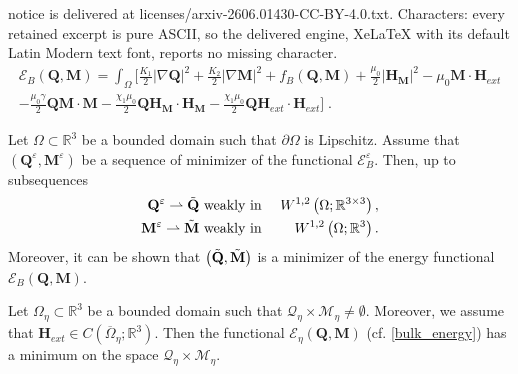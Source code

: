 \documentclass[10pt,a4paper]{amsart}
\def \Mvec{\mathbf{M}}
\def\Hvec{\mathbf{H}}
\def\Qvec{\mathbf{Q}}
\begin{document}
notice is delivered at licenses/arxiv-2606.01430-CC-BY-4.0.txt. Characters: every retained excerpt is pure ASCII, so the delivered engine, XeLaTeX with its default Latin Modern text font, reports no missing character.
\begin{eqnarray}\label{bulk_energy}
\mathcal{E}_B\left(\Qvec, \Mvec\right) = \int_{\Omega}\biggl[ \frac{K_1}{2}|\nabla \Qvec|^2 + \frac{K_2}{2}|\nabla \Mvec|^2 + f_B\left(\Qvec, \Mvec\right) + \frac{\mu_0}{2}|\Hvec_{\Mvec}|^2 - \mu_0\Mvec\cdot \Hvec_{ext}\nonumber\\
- \frac{\mu_0\gamma}{2}\Qvec\Mvec\cdot\Mvec - \frac{\chi_1\mu_0}{2}\Qvec\Hvec_{\Mvec}\cdot\Hvec_{\Mvec} - \frac{\chi_1\mu_0}{2}\Qvec\Hvec_{ext}\cdot\Hvec_{ext}\biggr]\;.
\end{eqnarray}

\begin{proposition}\label{energy_bound}
Let $\Omega\subset\mathbb R^3$ be a bounded domain such that $\partial\Omega$ is Lipschitz. Assume that $\left(\Qvec^{\varepsilon}, \Mvec^{\varepsilon}\right)$ be a sequence of minimizer of the functional $\mathcal{E}^{\varepsilon}_B$. Then, up to subsequences 
\begin{eqnarray}
\Qvec^{\varepsilon}\rightharpoonup\Tilde{\Qvec} &\mbox{ weakly in }& W^{1,2}\left(\Omega; \mathbb R^{3\times 3}\right),\\
\Mvec^{\varepsilon}\rightharpoonup\Tilde{\Mvec} &\mbox{ weakly in }& W^{1,2}\left(\Omega; \mathbb R^3\right).
\end{eqnarray}
Moreover, it can be shown that $\left(\Tilde{\Qvec}, \Tilde{\Mvec}\right)$ is a minimizer of the energy functional $\mathcal{E}_B\left(\Qvec, \Mvec\right)$.
\end{proposition}

\begin{theorem}\label{th:minimizer}
Let $\Omega_{\eta}\subset\mathbb R^3$ be a bounded domain such that $\mathcal{Q}_{\eta}\times\mathcal{M}_{\eta}\ne\emptyset$. Moreover, we assume that $\Hvec_{ext}\in C\left(\overline{\Omega}_{\eta}; \mathbb R^3\right)$. Then the functional $\mathcal{E}_{\eta}\left(\Qvec, \Mvec\right)$ (cf. \eqref{bulk_energy}) has a minimum on the space $\mathcal{Q}_{\eta}\times\mathcal{M}_{\eta}$.
\end{theorem}
\end{document}
